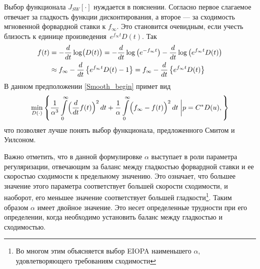 \documentclass[10pt]{article}
\theoremstyle{definition}
\theoremstyle{remark}
\theoremstyle{plain}
\newcommand{\w}{f_\infty}
\newcommand{\scalar}[2]{\left<#1,#2\right>}
\begin{document}
Выбор функционала $J_{SW}[\cdot]$ нуждается в пояснении.
Согласно \cite{Smith_Wilson} первое слагаемое отвечает за гладкость функции дисконтирования, а второе --- за сходимость мгновенной форвардной ставки к $\w$. Это становится очевидным, если учесть близость к единице произведения~$e^{\w t} D(t)$. Так
\begin{align}
f(t) &= - \frac{d}{dt} \log\bigl(D(t)\bigr)
	 = - \frac{d}{dt} \log\left(e^{-\w t}\right) - \frac{d}{dt} \log\left(e^{\w t} D(t)\right) \notag\\
	 &\approx \w - \frac{d}{dt} \left\{e^{\w t} D(t)-1\right\}
	 = \w - \frac{d}{dt}\left\{e^{\w t} D(t)\right\} \label{f_prox}
\end{align} 
В данном предположении \eqref{Smooth_begin} примет вид
\begin{align*}
\min\limits_{D(\cdot)}
\left\{
	\frac{1}{\alpha^3}
	\int\limits_0^\infty 
		\Bigl(
			\frac{d}{dt}
			f(t)
		\Bigr)^2
		\, dt
		+
	\frac{1}{\alpha}
	\int\limits_0^\infty 
		\Bigl(
			\w - f(t)
		\Bigr)^2
		\, dt \;
	\bigg|
	p = C^*D(u),
\right\}
\end{align*}
что позволяет лучше понять выбор функционала, предложенного Смитом и Уилсоном. 

Важно отметить, что в данной формулировке $\alpha$ выступает в роли параметра регуляризации, отвечающим за баланс между гладкостью форвардной ставки и ее скоростью сходимости к предельному значению. Это означает, что большее значение этого параметра соответствует большей скорости сходимости, и наоборот, его меньшее значение соответствует большей гладкости\footnote{Во многом этим объясняется выбор EIOPA наименьшего $\alpha$, удовлетворяющего требованиям сходимости}. Таким образом $\alpha$ имеет двойное значение. Это несет определенные трудности при его определении, когда необходимо установить баланс между гладкостью и сходимостью. 
%
\end{document}
